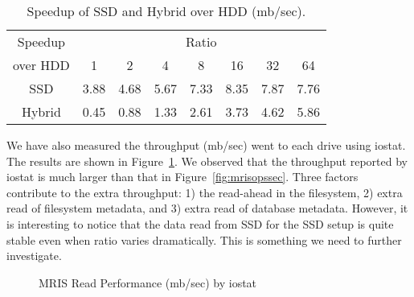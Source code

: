 \begin{table}[tc]
{\centering \footnotesize
\begin{tabular}{c|c|c|c|c|c|c|c}
\hline 
  Speedup & \multicolumn{7}{c}{Ratio} \\ \cline{2-8}
  over HDD & 1 & 2 & 4 & 8 & 16 & 32 & 64 \\ \hline
  SSD & 3.88 & 4.68 & 5.67 & 7.33 & 8.35 & 7.87 & 7.76 \\
  Hybrid & 0.45 & 0.88 & 1.33 & 2.61 & 3.73 & 4.62 & 5.86 \\ \hline
\end{tabular}
 \caption{Speedup of SSD and Hybrid over HDD (mb/sec).}
\label{tbl:spdupmb}
}
\end{table}


We have also measured the throughput (mb/sec) went to each drive using
iostat. The results are shown in Figure~\ref{fig:mrisiostat}. We
observed that the throughput reported by iostat is much larger than
that in Figure~\ref{fig:mrisopssec}. Three factors contribute to the
extra throughput: 1) the read-ahead in the filesystem, 2) extra read
of filesystem metadata, and 3) extra read of database metadata.
However, it is interesting to notice that the data read from SSD for
the SSD setup is quite stable even when ratio varies dramatically.
This is something we need to further investigate.

\begin{figure}[t]
\begin{centering}
\caption{MRIS Read Performance (mb/sec) by iostat}
\label{fig:mrisiostat}
\end{centering}
\end{figure}

